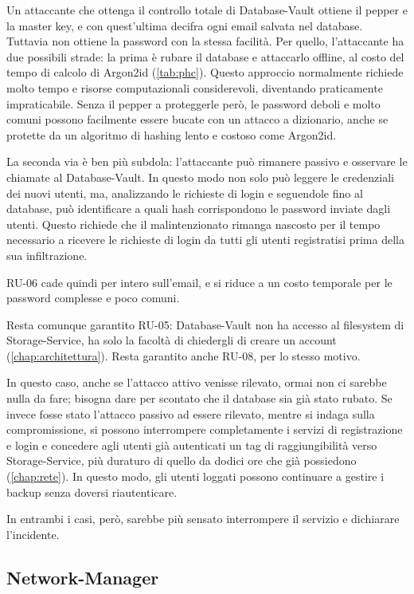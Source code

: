 Un attaccante che ottenga il controllo totale di Database-Vault ottiene il pepper e la master key, e con 
quest'ultima decifra ogni email salvata nel database. 
Tuttavia non ottiene la password con la stessa facilità. Per quello, l'attaccante ha due possibili strade:  
la prima è rubare il database e attaccarlo offline, al costo del tempo di calcolo di Argon2id (\autoref{tab:phc}).
Questo approccio normalmente richiede molto tempo e risorse computazionali considerevoli, diventando 
praticamente impraticabile. 
Senza il pepper a proteggerle però, le password deboli e molto comuni possono facilmente essere bucate con 
un attacco a dizionario, anche se protette da un algoritmo di hashing lento e costoso come Argon2id.

La seconda via è ben più subdola: l'attaccante può rimanere passivo e osservare le chiamate al Database-Vault. 
In questo modo non solo può leggere le credenziali dei nuovi utenti, ma, analizzando le richieste di login e 
seguendole fino al database, può identificare a quali hash corrispondono le password inviate dagli utenti. 
Questo richiede che il malintenzionato rimanga nascosto per il tempo necessario a ricevere le richieste di 
login da tutti gli utenti registratisi prima della sua infiltrazione.  

RU-06 cade quindi per intero sull'email, e si riduce a un costo temporale per le password complesse e poco
comuni.

Resta comunque garantito RU-05: Database-Vault non ha accesso al filesystem di Storage-Service, ha solo la
facoltà di chiedergli di creare un account (\autoref{chap:architettura}). Resta garantito anche RU-08, per
lo stesso motivo.

In questo caso, anche se l'attacco attivo venisse rilevato, ormai non ci sarebbe nulla da fare; bisogna dare
per scontato che il database sia già stato rubato.
Se invece fosse stato l'attacco passivo ad essere rilevato, mentre si indaga sulla compromissione, 
si possono interrompere completamente i servizi di registrazione e login e concedere agli 
utenti già autenticati un tag di raggiungibilità verso Storage-Service, più duraturo di quello da dodici ore che
già possiedono (\autoref{chap:rete}). In questo modo, gli utenti loggati possono continuare a gestire i 
backup senza doversi riautenticare. 

In entrambi i casi, però, sarebbe più sensato interrompere il servizio e dichiarare l'incidente.

\subsection{Network-Manager}

